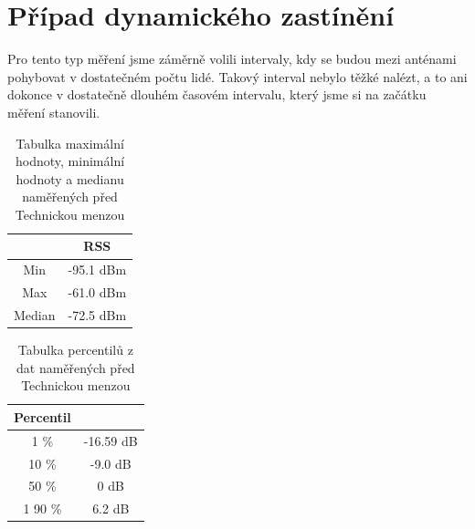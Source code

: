 \section{Případ dynamického zastínění}
Pro tento typ měření jsme záměrně volili intervaly, kdy se budou mezi anténami pohybovat v dostatečném počtu lidé. Takový interval nebylo těžké nalézt, a to ani dokonce v dostatečně dlouhém časovém intervalu, který jsme si na začátku měření stanovili.

\begin{table}[h!]
\centering
\begin{tabular}{|c|c|}
  \hline
   & RSS \\
  \hline
  Min & -95.1 dBm\\
  \hline
  Max & -61.0 dBm\\
  \hline
  Median & -72.5 dBm \\
  \hline
\end{tabular}
\caption{Tabulka maximální hodnoty, minimální hodnoty a medianu naměřených před Technickou menzou}
\end{table}

\begin{table}[h!]
\centering
\begin{tabular}{|c|c|}
  \hline
   Percentil &  \\
  \hline
  1 \% & -16.59 dB\\
  \hline
  10 \% & -9.0 dB\\
  \hline
  50 \% & 0 dB \\
  \hline1 
  90 \% & 6.2 dB \\
  \hline
\end{tabular}
\caption{Tabulka percentilů z dat naměřených před Technickou menzou}
\end{table}




